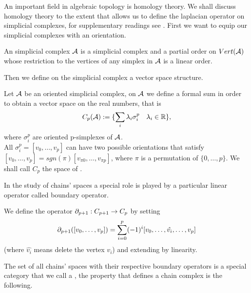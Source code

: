 \documentclass[../1.tex]{subfiles}
\begin{document}
    An important field in algebraic topology is homology theory. We shall discuss homology theory to the extent
    that allows us to define the laplacian operator on simplicial complexes, for supplementary readings see \cite{hatcher,singerthorpe}.
    First we want to equip our simplicial complexes with an orientation.

    \begin{defn}
        An  simplicial complex $\mathcal{A}$ is a simplicial complex and a partial order on $Vert(\mathcal{A})$ whose
        restriction to the vertices of any simplex in $\mathcal{A}$ is a linear order.
    \end{defn}

    Then we define on the simplicial complex a vector space structure.

    \begin{defn}
        Let $\mathcal{A}$ be an oriented simplicial complex, on $\mathcal{A}$ we define a formal sum in order
        to obtain a vector space on the real numbers, that is
        \[ C_p(\mathcal{A}) := \{ \sum_i \lambda_i \sigma_i^p \quad \lambda_i \in \mathbb{R} \},\]
        where $\sigma_i^p$ are oriented p-simplexes of $\mathcal{A}$.\\ %
        All $\sigma_i^p = [v_0,\dots,v_p]$ can have two possible orientations that satisfy
        $ [v_0,\dots,v_p] = sgn (\pi)[v_{\pi 0},\dots,v_{\pi p}]$,
        where $\pi$ is a permutation of $\{0,\dots,p\}$.  
        We shall call $C_p$ the space of .      
    \end{defn}

    In the study of chains' spaces a special role is played by a particular linear operator called
    boundary operator.

    \begin{defn}
        We define the  operator $\partial_{p+1} : C_{p+1} \to C_p$ by setting
        \[ \partial_{p+1}([v_0,\dots,v_p]) = \sum_{i=0}^p (-1)^i[v_0,\dots,\hat{v_i},\dots,v_p] \]
        (where $\hat{v_i}$ means delete the vertex $v_i$) and extending by linearity.
    \end{defn}

   The set of all chains' spaces with their respective boundary operators is a special category that we call a ,
   the property that defines a chain complex is the following.
\end{document}
